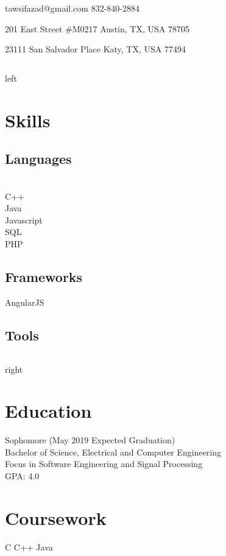 \documentclass{cv_class}
\begin{document}

\contact
    {tawsifazad@gmail.com}
    {832-840-2884}
\address
    {Local}
    {201 East  Street \#M0217}
    {Austin, TX, USA}
    {78705}
\address
    {Permanent}
    {23111 San Salvador Place}
    {Katy, TX, USA}
    {77494}

\begin{column}{left}
\section{Skills}
    \subsection{Languages}
      \\
    C++         \\
    Java        \\
    Javascript  \\
    SQL         \\
    PHP         \\
    \subsection{Frameworks}
    AngularJS   \\
    \subsection{Tools}
\end{column}
\begin{column}{right}
\section{Education}
Sophomore (May 2019 Expected Graduation) \\
Bachelor of Science, Electrical and Computer Engineering \\
Focus in Software Engineering and Signal Processing \\
GPA: 4.0

\section{Coursework}
\bullets
{C}
{C++}
{Java}

\end{column}
\end{document}
